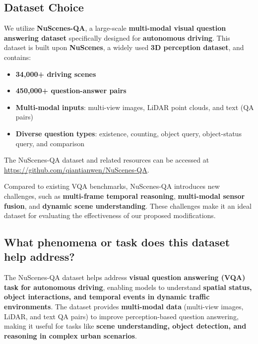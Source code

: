 \documentclass{article} %
\begin{document}
	\subsection*{Dataset Choice}
	We utilize \textbf{NuScenes-QA}, a large-scale \textbf{multi-modal visual question answering dataset} specifically designed for \textbf{autonomous driving}. This dataset is built upon \textbf{NuScenes}, a widely used \textbf{3D perception dataset}, and contains:
	\begin{itemize}
		\item \textbf{34,000+ driving scenes}
		\item \textbf{450,000+ question-answer pairs}
		\item \textbf{Multi-modal inputs}: multi-view images, LiDAR point clouds, and text (QA pairs)
		\item \textbf{Diverse question types}: existence, counting, object query, object-status query, and comparison
	\end{itemize}
	
	The NuScenes-QA dataset and related resources can be accessed at \url{https://github.com/qiantianwen/NuScenes-QA}.
	
	Compared to existing VQA benchmarks, NuScenes-QA introduces new challenges, such as \textbf{multi-frame temporal reasoning}, \textbf{multi-modal sensor fusion}, and \textbf{dynamic scene understanding}. These challenges make it an ideal dataset for evaluating the effectiveness of our proposed modifications.
	
	\subsection{ What phenomena or task does this dataset help address?}
	The NuScenes-QA dataset helps address \textbf{visual question answering (VQA) task for autonomous driving}, enabling models to understand \textbf{spatial status, object interactions, and temporal events in dynamic traffic environments}. The dataset provides \textbf{multi-modal data} (multi-view images, LiDAR, and text QA pairs) to improve perception-based question answering, making it useful for tasks like \textbf{scene understanding, object detection, and reasoning in complex urban scenarios}.
	
	
\end{document}
